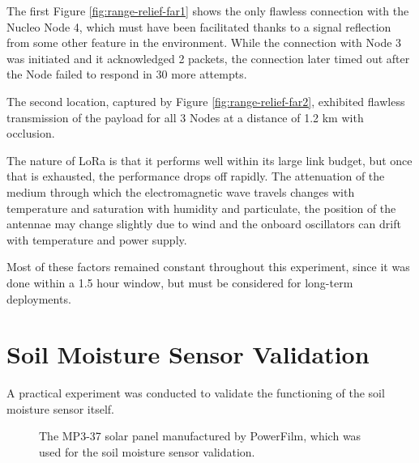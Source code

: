 The first Figure \ref{fig:range-relief-far1} shows the only flawless connection with the Nucleo Node 4, which must have been facilitated thanks to a signal reflection from some other feature in the environment. While the connection with Node 3 was initiated and it acknowledged 2 packets, the connection later timed out after the Node failed to respond in 30 more attempts.

The second location, captured by Figure \ref{fig:range-relief-far2}, exhibited flawless transmission of the payload for all 3 Nodes at a distance of 1.2 km with occlusion.

The nature of LoRa is that it performs well within its large link budget, but once that is exhausted, the performance drops off rapidly. The attenuation of the medium through which the electromagnetic wave travels changes with temperature and saturation with humidity and particulate, the position of the antennae may change slightly due to wind and the onboard oscillators can drift with temperature and power supply.

Most of these factors remained constant throughout this experiment, since it was done within a 1.5 hour window, but must be considered for long-term deployments.

\section{\label{section:sensor-validation}Soil Moisture Sensor Validation}
A practical experiment was conducted to validate the functioning of the soil moisture sensor itself.

\begin{figure}
    \centering
     \hfill
    \caption{\label{fig:panel}The MP3-37 solar panel manufactured by PowerFilm, which was used for the soil moisture sensor validation.}
\end{figure}

